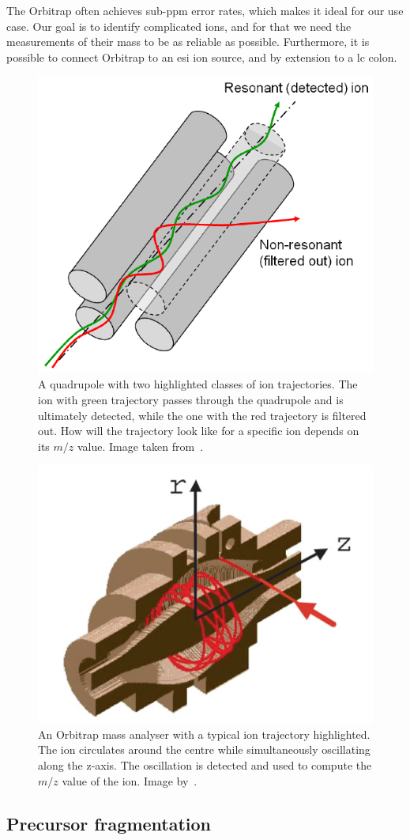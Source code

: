 \begin{description}
    The Orbitrap often achieves sub-ppm error rates, which makes it ideal for our use case. Our goal is to identify complicated ions, and for that we need the measurements of their mass to be as reliable as possible. Furthermore, it is possible to connect Orbitrap to an \gls*{esi} ion source, and by extension to a \gls*{lc} colon.
\end{description}

\begin{figure}
  \centering
  \includegraphics[width=.4\linewidth]{img/quadrupole.png}
  \caption{A quadrupole with two highlighted classes of ion trajectories. The ion with green trajectory passes through the quadrupole and is ultimately detected, while the one with the red trajectory is filtered out. How will the trajectory look like for a specific ion depends on its \(m/z\) value. Image taken from~\citet{2021Mass}.}\label{fig:quadrupole}
\end{figure}

\begin{figure}
  \centering
  \includegraphics[width=.5\linewidth]{img/orbitrap.png}
  \caption{An Orbitrap mass analyser with a typical ion trajectory highlighted. The ion circulates around the centre while simultaneously oscillating along the z-axis. The oscillation is detected and used to compute the \(m/z\) value of the ion. Image by~\citet{hu2005orbitrap}.}\label{fig:orbitrap}
\end{figure}

\subsection{Precursor fragmentation}\label{sec:fragmentation}

